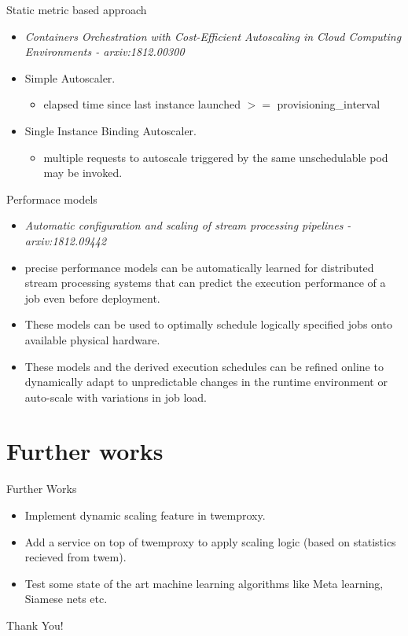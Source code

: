 \documentclass{beamer}
\begin{document}
\begin{frame}{Static metric based approach}
    \begin{itemize}
        \pause\item \textit{Containers Orchestration with Cost-Efficient Autoscaling in Cloud Computing Environments - arxiv:1812.00300}
        \pause\item Simple Autoscaler.
            \begin{itemize}
                \pause\item elapsed time since last instance launched $>=$ provisioning\_interval
            \end{itemize}
        \pause\item Single Instance Binding Autoscaler.
            \begin{itemize}
                \pause\item multiple requests to autoscale triggered by the same unschedulable pod may be invoked.
            \end{itemize}
    \end{itemize}
\end{frame}

\begin{frame}{Performace models}
    \begin{itemize}
        \pause\item \textit{Automatic configuration and scaling of stream processing pipelines - arxiv:1812.09442}
        \pause\item precise performance models can be automatically
learned for distributed stream processing systems
that can predict the execution performance of a job
even before deployment.
    \pause\item These models can be
used to optimally schedule logically specified jobs onto
available physical hardware.

    \pause\item These models and
the derived execution schedules can be refined online to
dynamically adapt to unpredictable changes in the runtime
environment or auto-scale with variations in job
load.
    \end{itemize}
\end{frame}


\section{Further works}
\begin{frame}{Further Works}
    \begin{itemize}
        \pause\item Implement dynamic scaling feature in twemproxy.
        \pause\item Add a service on top of twemproxy to apply scaling logic (based on statistics recieved from twem).

        \pause\item Test some state of the art machine learning algorithms like Meta learning, Siamese nets etc.
    \end{itemize}
\end{frame}

\begin{frame}
    \begin{center}
    \Huge{Thank You!}
    \end{center}
    \end{frame}
\end{document}
